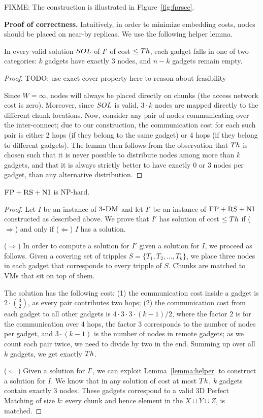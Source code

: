 FIXME: The construction is illustrated in Figure~\ref{fig:fprscc}.

\textbf{Proof of correctness.}
Intuitively, in order to minimize embedding costs,
nodes should be placed on near-by replicas. We use the following
helper lemma.
\begin{lemma}\label{lemma:helper}
In every valid solution $SOL$ of $I'$ of cost $\leq Th$, each gadget
falls in one of two categories:
$k$ gadgets have exactly
$3$ nodes, and $n-k$ gadgets remain empty.
\end{lemma}
\begin{proof}
TODO: use exact cover property here to reason about feasibility

Since $W=\infty$, nodes will always be placed
directly on chunks (the access network cost is zero).
Moreover, since
$SOL$ is valid, $3 \cdot k$ nodes are mapped
directly to the different chunk locations.
Now, consider any pair of nodes communicating over the
inter-connect; due to our construction, the communication cost
for each such pair is either
2 hops (if they belong to the same gadget) or 4 hops (if they belong
to different gadgets).
The lemma then follows from the observation that $Th$
is chosen such that it is never possible to distribute nodes
among more than $k$ gadgets, and that it is always strictly better to
have exactly 0 or 3 nodes per gadget, than any alternative distribution.
\end{proof}

\begin{theorem}
$\textsc{FP}+\textsc{RS}+\textsc{NI}$ is NP-hard.
\end{theorem}
\begin{proof}
Let $I$ be an instance of $\textsc{3-DM}$ and let $I'$ be an instance of
$\textsc{FP}+\textsc{RS}+\textsc{NI}$ constructed as described above.
We prove that $I'$ has solution of cost $\leq Th$ if ($\Rightarrow$) and only if
($\Leftarrow$)
$I$ has a solution.

($\Rightarrow$) In order to compute a solution
for $I'$ given a solution for $I$, we proceed as follows.
Given a covering set of tripples $S = \{T_1, T_2, \ldots, T_k\}$, we place three nodes in each gadget that
corresponds to every tripple of $S$. Chunks are matched to VMs that sit on top of them.

The solution has the following cost:
(1) the communication cost inside a gadget is $2 \cdot {3 \choose 2}$,
  as every pair contributes two hops;
  (2) the communication cost from each gadget to all other gadgets is $4
  \cdot 3 \cdot 3 \cdot (k - 1) / 2$, where the factor $2$ is
  for the
  communication over $4$ hops, the factor $3$
  corresponds to the number of nodes per gadget, and
  $3 \cdot (k-1)$ is the number of nodes in remote gadgets;
  as we count each pair twice, we need to divide by two in the end.
Summing up over all $k$ gadgets, we get exactly $Th$.

($\Leftarrow$) Given a solution for $I'$,
we can exploit Lemma~\ref{lemma:helper} to construct a solution for $I$.
We know that in any solution of cost at most $Th$,
$k$ gadgets contain exactly 3 nodes. These gadgets correspond to a valid
3D Perfect Matching of size $k$: every
chunk and hence element in the $X \cup Y \cup Z$, is matched.
\end{proof}

